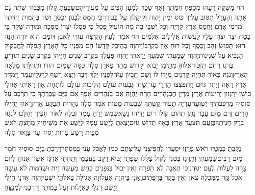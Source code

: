 \documentclass[../main/main.tex]{subfiles}
\begin{document}
\begin{multicols*}{\ncols}
הוֹי מַשְׁקֵה רֵעֵהוּ מְסַפֵּחַ חֲמָתְךָ וְאַף שַׁכֵּר לְמַעַן הַבִּיט עַל מְעוֹרֵיהֶם\PreVerseSpace{}שָׂבַעְתָּ קָלוֹן מִכָּבוֹד שְׁתֵה גַם אַתָּה וְהֵעָרֵל תִּסּוֹב עָלֶיךָ כּוֹס יְמִין יַהְוֶה וְקִיקָלוֹן עַל כְּבוֹדֶךָ\PreVerseSpace{}כִּי חֲמַס לְבָנוֹן יְכַסֶּךָּ וְשֹׁד בְּהֵמוֹת יְחִיתֶּךָ\SubEnd{} מִדְּמֵי אָדָם וַחֲמַס אֶרֶץ קִרְיָה וְכָל יֹשְׁבֵי בָהּ \ClosedSection{}מָה הוֹעִיל פֶּסֶל כִּי פְסָלוֹ יֹצְרוֹ מַסֵּכָה וּמוֹרֶה שָּׁקֶר כִּי בָטַח יֹצֵר יִצְרוֹ עָלָיו לַעֲשׂוֹת אֱלִילִים אִלְּמִים \ClosedSection{}הוֹי אֹמֵר לָעֵץ הָקִיצָה עוּרִי לְאֶבֶן דּוּמָם הוּא יוֹרֶה הִנֵּה הוּא תָּפוּשׂ זָהָב וָכֶסֶף וְכָל רוּחַ אֵין בְּקִרְבּוֹ\PreVerseSpace{}וַיהוָה בְּהֵיכַל קָדְשׁוֹ הַס מִפָּנָיו כָּל הָאָרֶץ \ClosedSection{}תְּפִלָּה לַחֲבַקּוּק הַנָּבִיא עַל שִׁגְיֹנוֹת\PreVerseSpace{}יַהְוֶה שָׁמַעְתִּי שִׁמְעֲךָ יָרֵאתִי יַהְוֶה פָּעָלְךָ בְּקֶרֶב שָׁנִים חַיֵּיהוּ בְּקֶרֶב שָׁנִים תּוֹדִיעַ בְּרֹגֶז רַחֵם תִּזְכּוֹר\PreVerseSpace{}אֱלוֹהַּ מִתֵּימָן יָבוֹא וְקָדוֹשׁ מֵהַר פָּארָן סֶלָה כִּסָּה שָׁמַיִם הוֹדוֹ וּתְהִלָּתוֹ מָלְאָה הָאָרֶץ\PreVerseSpace{}וְנֹגַהּ כָּאוֹר תִּהְיֶה קַרְנַיִם מִיָּדוֹ לוֹ וְשָׁם חֶבְיוֹן עֻזֹּה\PreVerseSpace{}לְפָנָיו יֵלֶךְ דָּבֶר וְיֵצֵא רֶשֶׁף לְרַגְלָיו\PreVerseSpace{}עָמַד וַיְמֹדֶד אֶרֶץ רָאָה וַיַּתֵּר גּוֹיִם וַיִּתְפֹּצְצוּ הַרְרֵי עַד שַׁחוּ גִּבְעוֹת עוֹלָם הֲלִיכוֹת עוֹלָם לוֹ\PreVerseSpace{}תַּחַת אָוֶן רָאִיתִי אָהֳלֵי כוּשָׁן יִרְגְּזוּן יְרִיעוֹת אֶרֶץ מִדְיָן \ClosedSection{}הֲבִנְהָרִים חָרָה יַהְוֶה אִם בַּנְּהָרִים אַפֶּךָ אִם בַּיָּם עֶבְרָתֶךָ כִּי תִרְכַּב עַל סוּסֶיךָ מַרְכְּבֹתֶיךָ יְשׁוּעָה\PreVerseSpace{}עֶרְיָה תֵעוֹר קַשְׁתֶּךָ שְׁבֻעוֹת מַטּוֹת אֹמֶר סֶלָה נְהָרוֹת תְּבַקַּע אָרֶץ\PreVerseSpace{}רָאוּךָ יָחִילוּ הָרִים זֶרֶם מַיִם עָבָר נָתַן תְּהוֹם קוֹלוֹ רוֹם יָדֵיהוּ נָשָׂא\PreVerseSpace{}שֶׁמֶשׁ יָרֵחַ עָמַד זְבֻלָה לְאוֹר חִצֶּיךָ יְהַלֵּכוּ לְנֹגַהּ בְּרַק חֲנִיתֶךָ\PreVerseSpace{}בְּזַעַם תִּצְעַד אָרֶץ בְּאַף תָּדוּשׁ גּוֹיִם\PreVerseSpace{}יָצָאתָ לְיֵשַׁע עַמֶּךָ לְיֵשַׁע אֶת מְשִׁיחֶיךָ מָחַצְתָּ רֹּאשׁ מִבֵּית רָשָׁע עָרוֹת יְסוֹד עַד צַוָּאר סֶלָה\OpenSection{}\par
{}נָקַבְתָּ בְמַטָּיו רֹאשׁ פְּרָזָו יִסְעֲרוּ לַהֲפִיצֵנִי עֲלִיצֻתָם כְּמוֹ לֶאֱכֹל עָנִי בַּמִּסְתָּר\PreVerseSpace{}דָּרַכְתָּ בַיָּם סוּסֶיךָ חֹמֶר מַיִם רַבִּים\PreVerseSpace{}שָׁמַעְתִּי וַתִּרְגַּז בִּטְנִי לְקוֹל צָלֲלוּ שְׂפָתַי יָבוֹא רָקָב בַּעֲצָמַי וְתַחְתַּי אֶרְגָּז אֲשֶׁר אָנוּחַ לְיוֹם צָרָה לַעֲלוֹת לְעַם יְגוּדֶנּוּ\PreVerseSpace{}כִּי תְאֵנָה לֹא תִפְרָח וְאֵין יְבוּל בַּגְּפָנִים כִּחֵשׁ מַעֲשֵׂה זַיִת וּשְׁדֵמוֹת לֹא עָשָׂה אֹכֶל גָּזַר מִמִּכְלָה צֹאן וְאֵין בָּקָר בָּרְפָתִים\PreVerseSpace{}וַאֲנִי בַּיהוָה אֶעְלוֹזָה אָגִילָה בֵּאלֹהֵי יִשְׁעִי\PreVerseSpace{}יַהְוֶה אֲדֹנַי חֵילִי וַיָּשֶׂם רַגְלַי כָּאַיָּלוֹת וְעַל בָּמוֹתַי יַדְרִכֵנִי לַמְנַצֵּחַ\par
\end{multicols*}
\end{document}
